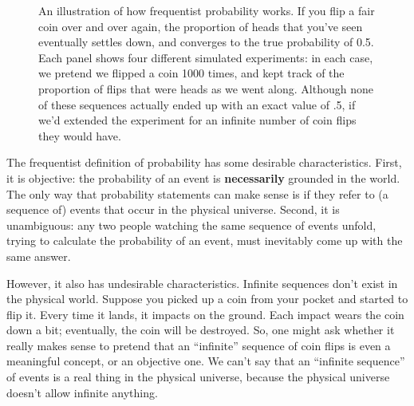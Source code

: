 \documentclass[
  letterpaper,
  DIV=11,
  numbers=noendperiod]{scrreprt}
\begin{document}
\begin{figure}


\caption{\label{fig-4FreqProb}An illustration of how frequentist
probability works. If you flip a fair coin over and over again, the
proportion of heads that you've seen eventually settles down, and
converges to the true probability of 0.5. Each panel shows four
different simulated experiments: in each case, we pretend we flipped a
coin 1000 times, and kept track of the proportion of flips that were
heads as we went along. Although none of these sequences actually ended
up with an exact value of .5, if we'd extended the experiment for an
infinite number of coin flips they would have.}

\end{figure}%

The frequentist definition of probability has some desirable
characteristics. First, it is objective: the probability of an event is
\textbf{necessarily} grounded in the world. The only way that
probability statements can make sense is if they refer to (a sequence
of) events that occur in the physical universe. Second, it is
unambiguous: any two people watching the same sequence of events unfold,
trying to calculate the probability of an event, must inevitably come up
with the same answer.

However, it also has undesirable characteristics. Infinite sequences
don't exist in the physical world. Suppose you picked up a coin from
your pocket and started to flip it. Every time it lands, it impacts on
the ground. Each impact wears the coin down a bit; eventually, the coin
will be destroyed. So, one might ask whether it really makes sense to
pretend that an ``infinite'' sequence of coin flips is even a meaningful
concept, or an objective one. We can't say that an ``infinite sequence''
of events is a real thing in the physical universe, because the physical
universe doesn't allow infinite anything.
\end{document}

